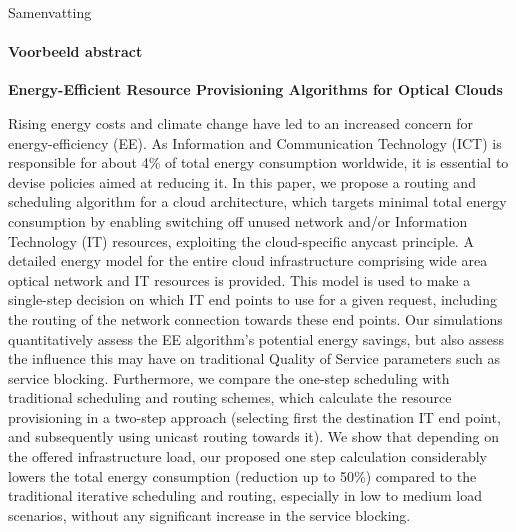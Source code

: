 \begin{frame}{Samenvatting}
\framesubtitle{Voorbeeld abstract}

\begin{center}
\end{center}

\scriptsize
\textbf{Energy-Efficient Resource Provisioning Algorithms for Optical Clouds}

\alert<1>{Rising energy costs and climate change have led to an increased concern for energy-efficiency (EE). As Information and Communication Technology (ICT) is responsible for about 4\% of total energy consumption worldwide, it is essential to devise policies aimed at reducing it.} \alert<2>{In this paper, we propose a routing and scheduling algorithm for a cloud architecture, which targets minimal total energy consumption by enabling switching off unused network and/or Information Technology (IT) resources, exploiting the cloud-specific anycast principle.} \alert<3>{A detailed energy model for the entire cloud infrastructure comprising wide area optical network and IT resources is provided. This model is used to make a single-step decision on which IT end points to use for a given request, including the routing of the network connection towards these end points. Our simulations quantitatively assess the EE algorithm’s potential energy savings, but also assess the influence this may have on traditional Quality of Service parameters such as service blocking. Furthermore, we compare the one-step scheduling with traditional scheduling and routing schemes, which calculate the resource provisioning in a two-step approach (selecting first the destination IT end point, and subsequently using unicast routing towards it).} \alert<4>{We show that depending on the offered infrastructure load, our proposed one step calculation considerably lowers the total energy consumption (reduction up to 50\%) compared to the traditional iterative scheduling and routing, especially in low to medium load scenarios, without any significant increase in the service blocking.}

\end{frame}

